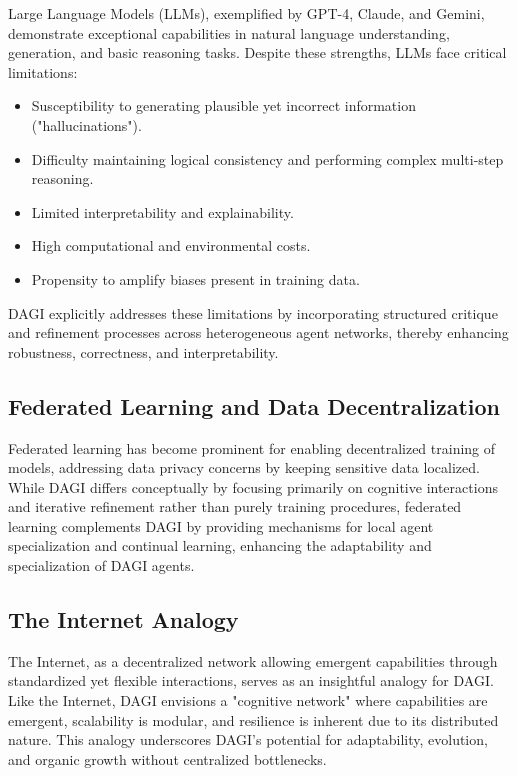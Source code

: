 \documentclass[12pt]{amsart}
\begin{document}
Large Language Models (LLMs), exemplified by GPT-4, Claude, and Gemini, demonstrate exceptional capabilities in natural language understanding, generation, and basic reasoning tasks. Despite these strengths, LLMs face critical limitations:

\begin{itemize}
    \item Susceptibility to generating plausible yet incorrect information ("hallucinations").
    \item Difficulty maintaining logical consistency and performing complex multi-step reasoning.
    \item Limited interpretability and explainability.
    \item High computational and environmental costs.
    \item Propensity to amplify biases present in training data.
\end{itemize}

DAGI explicitly addresses these limitations by incorporating structured critique and refinement processes across heterogeneous agent networks, thereby enhancing robustness, correctness, and interpretability.


\subsection{Federated Learning and Data Decentralization}
Federated learning has become prominent for enabling decentralized training of models, addressing data privacy concerns by keeping sensitive data localized. While DAGI differs conceptually by focusing primarily on cognitive interactions and iterative refinement rather than purely training procedures, federated learning complements DAGI by providing mechanisms for local agent specialization and continual learning, enhancing the adaptability and specialization of DAGI agents.


\subsection{The Internet Analogy}
The Internet, as a decentralized network allowing emergent capabilities through standardized yet flexible interactions, serves as an insightful analogy for DAGI. Like the Internet, DAGI envisions a "cognitive network" where capabilities are emergent, scalability is modular, and resilience is inherent due to its distributed nature. This analogy underscores DAGI’s potential for adaptability, evolution, and organic growth without centralized bottlenecks.
\end{document}
